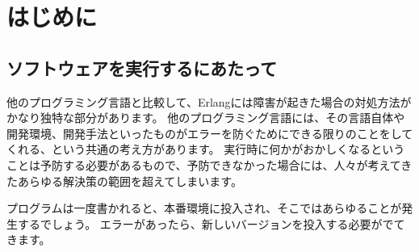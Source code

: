 \chapter*{はじめに}
\label{chap:introduction}
\setcounter{page}{1}


\section*{ソフトウェアを実行するにあたって}
\label{sec:on-running-software}


他のプログラミング言語と比較して、Erlangには障害が起きた場合の対処方法がかなり独特な部分があります。
他のプログラミング言語には、その言語自体や開発環境、開発手法といったものがエラーを防ぐためにできる限りのことをしてくれる、という共通の考え方があります。
実行時に何かがおかしくなるということは予防する必要があるもので、予防できなかった場合には、人々が考えてきたあらゆる解決策の範囲を超えてしまいます。

プログラムは一度書かれると、本番環境に投入され、そこではあらゆることが発生するでしょう。
エラーがあったら、新しいバージョンを投入する必要がでてきます。

